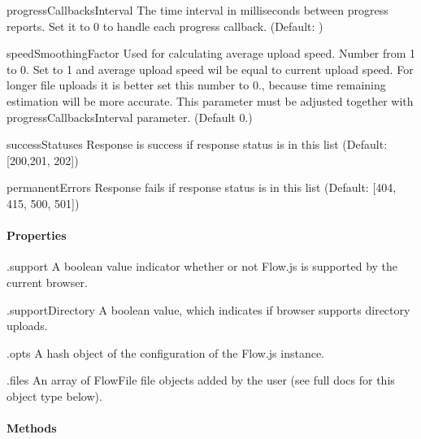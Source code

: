 \begin{DoxyItemize}
\item {\ttfamily progress\+Callbacks\+Interval} The time interval in milliseconds between progress reports. Set it to 0 to handle each progress callback. (Default\+: {})
\item {\ttfamily speed\+Smoothing\+Factor} Used for calculating average upload speed. Number from 1 to 0. Set to 1 and average upload speed wil be equal to current upload speed. For longer file uploads it is better set this number to 0., because time remaining estimation will be more accurate. This parameter must be adjusted together with {\ttfamily progress\+Callbacks\+Interval} parameter. (Default 0.)
\item {\ttfamily success\+Statuses} Response is success if response status is in this list (Default\+: {\ttfamily \mbox{[}200,201, 202\mbox{]}})
\item {\ttfamily permanent\+Errors} Response fails if response status is in this list (Default\+: {\ttfamily \mbox{[}404, 415, 500, 501\mbox{]}})
\end{DoxyItemize}

\paragraph*{Properties}


\begin{DoxyItemize}
\item {\ttfamily .support} A boolean value indicator whether or not Flow.\+js is supported by the current browser.
\item {\ttfamily .support\+Directory} A boolean value, which indicates if browser supports directory uploads.
\item {\ttfamily .opts} A hash object of the configuration of the Flow.\+js instance.
\item {\ttfamily .files} An array of {\ttfamily Flow\+File} file objects added by the user (see full docs for this object type below).
\end{DoxyItemize}

\paragraph*{Methods}



